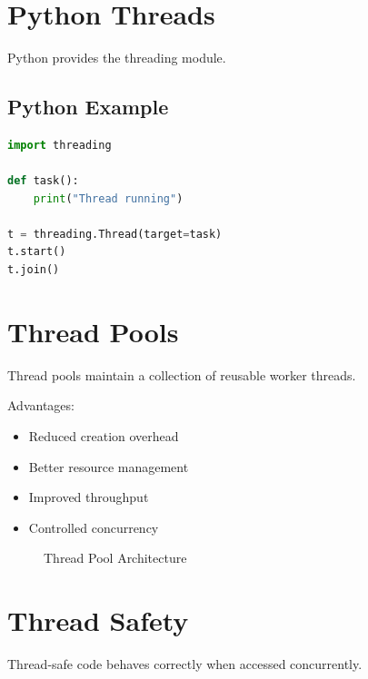 \section{Python Threads}

Python provides the threading module.

\subsection{Python Example}

\begin{lstlisting}[language=Python,style=interviewcode]
import threading

def task():
    print("Thread running")

t = threading.Thread(target=task)
t.start()
t.join()
\end{lstlisting}

\section{Thread Pools}

Thread pools maintain a collection of reusable worker threads.

Advantages:

\begin{itemize}
\item Reduced creation overhead
\item Better resource management
\item Improved throughput
\item Controlled concurrency
\end{itemize}

\begin{figure}[H]
\centering
{}
\caption{Thread Pool Architecture}
\end{figure}

\section{Thread Safety}

Thread-safe code behaves correctly when accessed concurrently.

